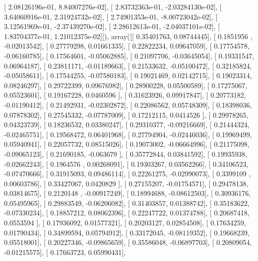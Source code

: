 \documentclass{article}
\begin{document}
       [  2.08126196e-01,   8.84007276e-02],
       [  2.83732363e-01,  -2.03284130e-02],
       [  3.64060916e-01,   2.31924732e-02],
       [  2.74901353e-01,  -8.00723042e-02],
       [  3.12561969e-01,  -2.37439270e-02],
       [  2.28612613e-01,  -2.04037101e-02],
       [  1.83704377e-01,   1.21012375e-02]]), array([[ 0.35401763,  0.08744445],
       [ 0.1851956 , -0.02013542],
       [ 0.27779298,  0.01661335],
       [ 0.22822234,  0.09647059],
       [ 0.17754578, -0.06160785],
       [ 0.17564601, -0.05062885],
       [ 0.21097706, -0.03645054],
       [ 0.19331547,  0.06964187],
       [ 0.23811171, -0.01189663],
       [ 0.21533632, -0.05100472],
       [ 0.32185824, -0.05058611],
       [ 0.17544255, -0.07580183],
       [ 0.19021469,  0.02142715],
       [ 0.19023314,  0.08246297],
       [ 0.29722399,  0.09676982],
       [ 0.28900228,  0.05500589],
       [ 0.17275067,  0.05523601],
       [ 0.19167228,  0.0460596 ],
       [ 0.31623926,  0.09917847],
       [ 0.20773182, -0.01190412],
       [ 0.21492931, -0.02302872],
       [ 0.22086562,  0.05748309],
       [ 0.18398036,  0.07878302],
       [ 0.27545332, -0.07787009],
       [ 0.17212115,  0.0414526 ],
       [ 0.29978265,  0.04323739],
       [ 0.18236532,  0.03380247],
       [ 0.29310377, -0.09216669],
       [ 0.21444324, -0.02465751],
       [ 0.19568472,  0.06401968],
       [ 0.27794904, -0.02446036],
       [ 0.19969499,  0.05940941],
       [ 0.22057732,  0.08515026],
       [ 0.19073002, -0.06664996],
       [ 0.21175098, -0.09065123],
       [ 0.21690185, -0.063679  ],
       [ 0.35772844,  0.03841592],
       [ 0.19935938, -0.02662243],
       [ 0.1964576 ,  0.00268091],
       [ 0.19303267,  0.03562266],
       [ 0.34106523, -0.07470666],
       [ 0.31915093,  0.09486114],
       [ 0.22261275, -0.02990073],
       [ 0.3399109 ,  0.00603786],
       [ 0.33427067,  0.0420829 ],
       [ 0.27155207, -0.01754571],
       [ 0.29478138,  0.03814675],
       [ 0.2120148 , -0.00917249],
       [ 0.18994688, -0.08612503],
       [ 0.30936176,  0.05495965],
       [ 0.29883549, -0.06206082],
       [ 0.31403857,  0.01388742],
       [ 0.35183622, -0.07330234],
       [ 0.18857212,  0.08062396],
       [ 0.22247722,  0.01374788],
       [ 0.20687418,  0.0553594 ],
       [ 0.17936092,  0.01577321],
       [ 0.20203127,  0.02854508],
       [ 0.17634259,  0.01790434],
       [ 0.34899594,  0.05794912],
       [ 0.33172045, -0.08119352],
       [ 0.19668239,  0.05518001],
       [ 0.20227346, -0.09865659],
       [ 0.35586048, -0.06897703],
       [ 0.20809054, -0.01215575],
       [ 0.17663723,  0.05990431],
\end{document}
